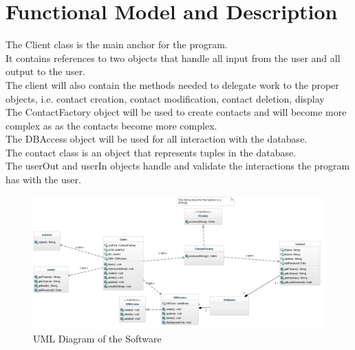 \documentclass{article}
\begin{document}
\section{Functional Model and Description}
The Client class is the main anchor for the program. \\
It contains references to two objects that handle all input from the user and all output to the user. \\
The client will also contain the methods needed to delegate work to the proper objects, i.e. contact creation, contact modification, contact deletion, display \\

The ContactFactory object will be used to create contacts and will become more complex as as the contacts become more complex. \\
The DBAccess object will be used for all interaction with the database. \\
The contact class is an object that represents tuples in the database. \\
The userOut and userIn objects handle and validate the interactions the program has with the user. \\
\begin{figure}[H]
\centering
\includegraphics[width=170mm]{img/UML.jpg}
\caption{UML Diagram of the Software \label{UML}}
\end{figure}


\end{document}
